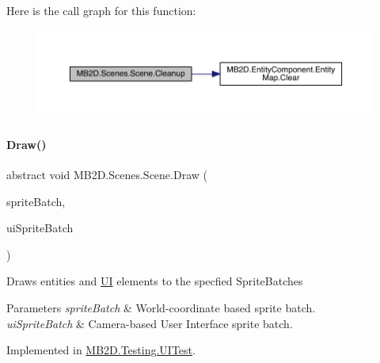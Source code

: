 Here is the call graph for this function\+:
\nopagebreak
\begin{figure}[H]
\begin{center}
\leavevmode
\includegraphics[width=350pt]{class_m_b2_d_1_1_scenes_1_1_scene_a3ee3777b94ccff0a739e75ca1ca151c6_cgraph}
\end{center}
\end{figure}
\hypertarget{class_m_b2_d_1_1_scenes_1_1_scene_a932d33071ecb4c5187367825dba72324}{}\label{class_m_b2_d_1_1_scenes_1_1_scene_a932d33071ecb4c5187367825dba72324} 
\paragraph{\texorpdfstring{Draw()}{Draw()}}
{\footnotesize\ttfamily abstract void M\+B2\+D.\+Scenes.\+Scene.\+Draw (\begin{DoxyParamCaption}\item[{Sprite\+Batch}]{sprite\+Batch,  }\item[{Sprite\+Batch}]{ui\+Sprite\+Batch }\end{DoxyParamCaption})\hspace{0.3cm}{\ttfamily [pure virtual]}}



Draws entities and \hyperlink{namespace_m_b2_d_1_1_u_i}{UI} elements to the specfied Sprite\+Batches 


\begin{DoxyParams}{Parameters}
{\em sprite\+Batch} & World-\/coordinate based sprite batch.\\
\hline
{\em ui\+Sprite\+Batch} & Camera-\/based User Interface sprite batch.\\
\hline
\end{DoxyParams}


Implemented in \hyperlink{class_m_b2_d_1_1_testing_1_1_u_i_test_a9656d2d62517288a7b4387dafe741ea0}{M\+B2\+D.\+Testing.\+U\+I\+Test}.

\hypertarget{class_m_b2_d_1_1_scenes_1_1_scene_a099b79e16d23b67349847999d2336813}{}\label{class_m_b2_d_1_1_scenes_1_1_scene_a099b79e16d23b67349847999d2336813} 
